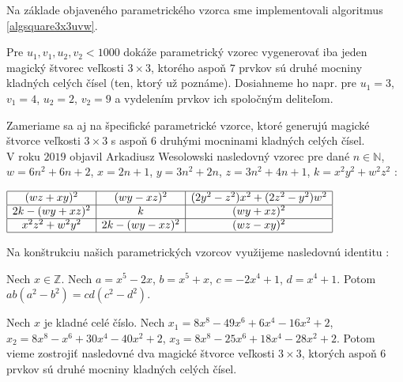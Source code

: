 Na základe objaveného parametrického vzorca sme implementovali algoritmus \ref{algsquare3x3uvw}.

\begin{result} Pre $u_1, v_1, u_2, v_2 < 1000$ dokáže parametrický vzorec vygenerovať iba jeden magický štvorec veľkosti $3 \times 3$, ktorého aspoň $7$ prvkov sú druhé mocniny kladných celých čísel (ten, ktorý už poznáme). Dosiahneme ho napr. pre $u_1 = 3$, $v_1 = 4$, $u_2 = 2$, $v_2 = 9$ a vydelením prvkov ich spoločným deliteľom.
\end{result}

Zameriame sa aj na špecifické parametrické vzorce, ktoré generujú magické štvorce veľkosti $3 \times 3$ s aspoň $6$ druhými mocninami kladných celých čísel. \\

V roku $2019$ objavil Arkadiusz Wesolowski nasledovný vzorec pre dané $n \in \mathbb{N}$, $w = 6n^2 + 6n + 2$, $x = 2n + 1$, $y = 3n^2 + 2n$, $z = 3n^2 + 4n + 1$, $k = x^2 y^2 + w^2 z^2$ \cite{multimagie}:

\begin{center}
$\begin{array}{ |c|c|c| } 
\hline
(wz + xy)^2 & (wy - xz)^2 & (2y^2 - z^2)x^2 + (2z^2 - y^2)w^2 \\ 
\hline
2k - (wy + xz)^2 & k & (wy + xz)^2 \\ 
\hline
x^2 z^2 + w^2 y^2 & 2k - (wy - xz)^2 & (wz - xy)^2 \\
\hline
\end{array}$
\end{center}

Na konštrukciu našich parametrických vzorcov využijeme nasledovnú identitu \cite{algebraic}:


\begin{lemma}
\label{square3x3x}
Nech $x \in \mathbb{Z}$. Nech $a = x^5 - 2x$, $b = x^5 + x$, $c = -2x^4 + 1$, $d = x^4 + 1$. Potom $ab(a^2 - b^2) = cd(c^2 - d^2)$.
\end{lemma}

\begin{theorem}
\label{3x3square6squares}
Nech $x$ je kladné celé číslo. Nech $x_1 = 8x^8 - 49x^6 + 6x^4 - 16x^2 + 2$, $x_2 = 8x^8 - x^6 + 30x^4 - 40x^2 + 2$, $x_3 = 8x^8 - 25x^6 + 18x^4 - 28x^2 + 2$. Potom vieme zostrojiť nasledovné dva magické štvorce veľkosti $3 \times 3$, ktorých aspoň $6$ prvkov sú druhé mocniny kladných celých čísel.
\end{theorem}

